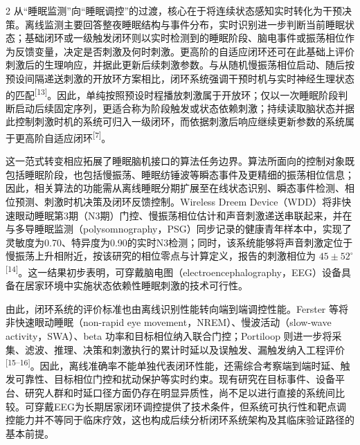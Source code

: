 \documentclass[UTF8,zihao=5,fontset=none]{ctexart}
\newcommand{\hei}{\CJKfamily{hei}}
\newcommand{\leveltwo}[1]{%
  \par\noindent{\hei\fontsize{10pt}{12pt}\selectfont\bfseries #1\par}}
\newcommand{\refcite}[1]{\nolinebreak[4]\textsuperscript{[#1]}}
\begin{document}
\begin{multicols}{2}
从“睡眠监测”向“睡眠调控”的过渡，核心在于将连续状态感知实时转化为干预决策。离线监测主要回答整夜睡眠结构与事件分布，实时识别进一步判断当前睡眠状态；基础闭环或一级触发闭环则以实时检测到的睡眠阶段、脑电事件或振荡相位作为反馈变量，决定是否刺激及何时刺激。更高阶的自适应闭环还可在此基础上评价刺激后的生理响应，并据此更新后续刺激参数。与从随机慢振荡相位启动、随后按预设间隔递送刺激的开放环方案相比，闭环系统强调干预时机与实时神经生理状态的匹配\refcite{13}。因此，单纯按照预设时程播放刺激属于开放环；仅以一次睡眠阶段判断启动后续固定序列，更适合称为阶段触发或状态依赖刺激；持续读取脑状态并据此控制刺激时机的系统可归入一级闭环，而依据刺激后响应继续更新参数的系统属于更高阶自适应闭环\refcite{7}。

这一范式转变相应拓展了睡眠脑机接口的算法任务边界。算法所面向的控制对象既包括睡眠阶段，也包括慢振荡、睡眠纺锤波等瞬态事件及更精细的振荡相位信息；因此，相关算法的功能需从离线睡眠分期扩展至在线状态识别、瞬态事件检测、相位预测、刺激时机决策及闭环反馈控制。Wireless Dreem Device（WDD）将非快速眼动睡眠第3期（N3期）门控、慢振荡相位估计和声音刺激递送串联起来，并在与多导睡眠监测（polysomnography，PSG）同步记录的健康青年样本中，实现了灵敏度为0.70、特异度为0.90的实时N3检测；同时，该系统能够将声音刺激定位于慢振荡上升相附近，按该研究的相位零点与计算定义，报告的刺激相位为 $45\pm52^{\circ}$\refcite{14}。这一结果初步表明，可穿戴脑电图（electroencephalography，EEG）设备具备在居家环境中实施状态依赖性睡眠刺激的技术可行性。

由此，闭环系统的评价标准也由离线识别性能转向端到端调控性能。Ferster 等将非快速眼动睡眠（non-rapid eye movement，NREM）、慢波活动（slow-wave activity，SWA）、beta 功率和目标相位纳入联合门控；Portiloop 则进一步将采集、滤波、推理、决策和刺激执行的累计时延以及误触发、漏触发纳入工程评价\refcite{15--16}。因此，离线准确率不能单独代表闭环性能，还需综合考察端到端时延、触发可靠性、目标相位门控和扰动保护等实时约束。现有研究在目标事件、设备平台、研究人群和时延口径方面仍存在明显异质性，尚不足以进行直接的系统间比较。可穿戴EEG为长期居家闭环调控提供了技术条件，但系统可执行性和靶点调控能力并不等同于临床疗效，这也构成后续分析闭环系统架构及其临床验证路径的基本前提。

\leveltwo{1.3 闭环睡眠干预系统的基本架构}


\end{multicols}
\end{document}
